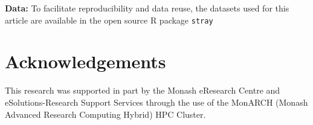 \documentclass[11pt,a4paper,]{article}
\theoremstyle{definition}
\theoremstyle{definition}
\theoremstyle{definition}
\theoremstyle{remark}
\begin{document}
\textbf{Data:} To facilitate reproducibility and data reuse, the datasets used for this article are available in the open source R package \texttt{stray} \autocite{strayR2019}

\hypertarget{acknowledgements}{%
\section*{Acknowledgements}\label{acknowledgements}}

This research was supported in part by the Monash eResearch Centre and eSolutions-Research Support Services through the use of the MonARCH (Monash Advanced Research Computing Hybrid) HPC Cluster.

\printbibliography
\end{document}
